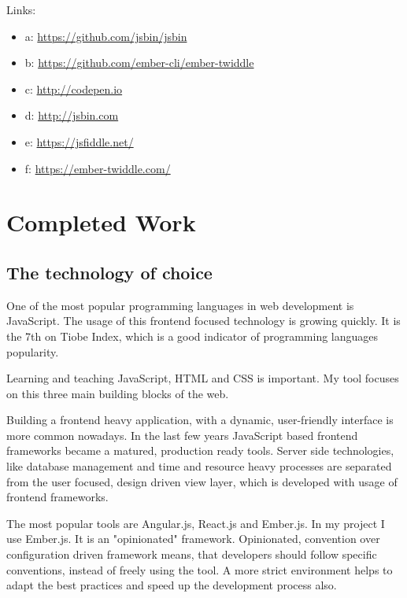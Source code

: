 \documentclass[11pt, a4paper, twoside, openright]{report}
\begin{document}
Links:
\begin{itemize}[noitemsep]
\item a: \url{https://github.com/jsbin/jsbin} \\
\item b: \url{https://github.com/ember-cli/ember-twiddle} \\
\item c: \url{http://codepen.io} \\
\item d: \url{http://jsbin.com} \\
\item e: \url{https://jsfiddle.net/} \\
\item f: \url{https://ember-twiddle.com/} \\
\end{itemize}

\chapter{Completed Work}

\section{The technology of choice}

One of the most popular programming languages in web development is JavaScript. The usage of this frontend focused technology is growing quickly.  It is the 7th on Tiobe Index, which is a good indicator of programming languages popularity. \cite{tiobe}

Learning and teaching JavaScript, HTML and CSS is important. My tool focuses on this three main building blocks of the web.

Building a frontend heavy application, with a dynamic, user-friendly interface is more common nowadays. In the last few years JavaScript based frontend frameworks became a matured, production ready tools. Server side technologies, like database management and time and resource heavy processes are separated from the user focused, design driven view layer, which is developed with usage of frontend frameworks.

The most popular tools are Angular.js, React.js and Ember.js. In my project I use Ember.js. It is an "opinionated" framework. Opinionated, convention over configuration driven framework means, that developers should follow specific conventions, instead of freely using the tool. A more strict environment helps to adapt the best practices and speed up the development process also.
\end{document}
